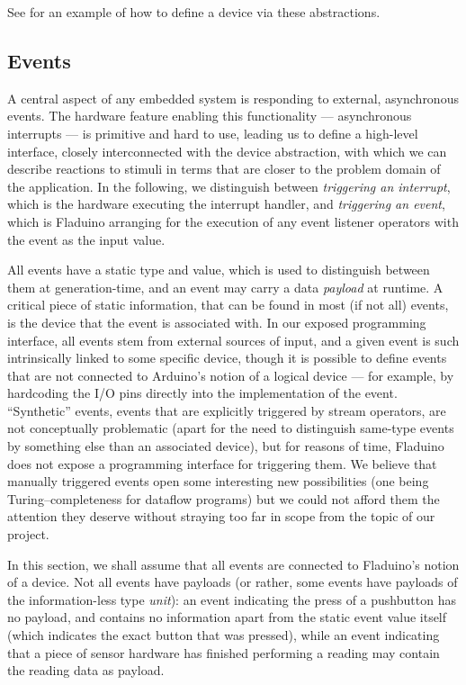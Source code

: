 \documentclass[a4paper, oneside, final]{memoir}
\let\Fref\undefined
\begin{document}
See \Fref{sec:pushbuttondef} for an example of how to define a device
via these abstractions.

\subsection{Events}
\label{sec:events_design}
A central aspect of any embedded system is responding to external,
asynchronous events.  The hardware feature enabling this functionality
--- asynchronous interrupts --- is primitive and hard to use, leading
us to define a high-level interface, closely interconnected with the
device abstraction, with which we can describe reactions to stimuli in
terms that are closer to the problem domain of the application.  In
the following, we distinguish between \textit{triggering an
  interrupt}, which is the hardware executing the interrupt handler,
and \textit{triggering an event}, which is Fladuino arranging for the
execution of any event listener operators with the event as the input
value.

All events have a static type and value, which is used to distinguish
between them at generation-time, and an event may carry a data
\textit{payload} at runtime.  A critical piece of static information,
that can be found in most (if not all) events, is the device that the
event is associated with.  In our exposed programming interface, all
events stem from external sources of input, and a given event is such
intrinsically linked to some specific device, though it is possible to
define events that are not connected to Arduino's notion of a logical
device --- for example, by hardcoding the I/O pins directly into the
implementation of the event.  ``Synthetic'' events, events that are
explicitly triggered by stream operators, are not conceptually
problematic (apart for the need to distinguish same-type events by
something else than an associated device), but for reasons of time,
Fladuino does not expose a programming interface for triggering them.
We believe that manually triggered events open some interesting new
possibilities (one being Turing--completeness for
dataflow programs) but we could not afford them the attention they
deserve without straying too far in scope from the topic of our
project.

In this section, we shall assume that all events are connected to
Fladuino's notion of a device.  Not all events have payloads (or
rather, some events have payloads of the information-less type
\textit{unit}): an event indicating the press of a pushbutton has no
payload, and contains no information apart from the static event value
itself (which indicates the exact button that was pressed), while an
event indicating that a piece of sensor hardware has finished
performing a reading may contain the reading data as payload.
\end{document}
